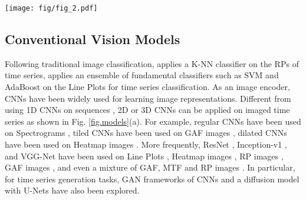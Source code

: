 \begin{figure*}[!t]
\centering
\texttt{[image: fig/fig\_2.pdf]}
\caption{An illustration of different modeling strategies on imaged time series in (a)(b)(c) and task-specific heads in (d).}\label{fig.models}
\vspace{-0.2cm}
\end{figure*}

\subsection{Conventional Vision Models}\label{sec.cnns}

Following traditional %
image classification, \cite{silva2013time} applies a K-NN classifier on the RPs of time series, \cite{cohen2020trading} applies an ensemble of fundamental classifiers such as %
SVM and AdaBoost on the Line Plots %
for time series classification. As an image encoder, %
CNNs have been %
widely used for learning image representations. %
Different from using 1D CNNs on sequences %
\cite{bai2018empirical}, %
2D or 3D CNNs can be applied on imaged time series as shown in Fig. \ref{fig.models}(a). %
For example, %
regular CNNs have been used on Spectrograms \cite{du2020image}, tiled CNNs have been used on GAF images \cite{wang2015encoding,wang2015imaging}, dilated CNNs have been used on Heatmap images \cite{yazdanbakhsh2019multivariate}. More frequently, ResNet \cite{he2016deep}, Inception-v1 \cite{szegedy2015going}, and VGG-Net \cite{simonyan2014very} have been used on Line Plots \cite{jin2023classification,semenoglou2023image}, Heatmap images \cite{zeng2021deep}, RP images \cite{li2020forecasting,kim2024cafo}, GAF images \cite{barra2020deep,kaewrakmuk2024multi}, 
and even a mixture of GAF, MTF and RP images \cite{costa2024fusion}. In particular, for time series generation tasks, %
GAN frameworks of CNNs \cite{li2022tts,karami2024timehr} and a diffusion model with U-Nets \cite{naiman2024utilizing} have also been explored.

